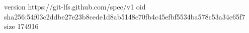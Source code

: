 version https://git-lfs.github.com/spec/v1
oid sha256:54f03c2ddbe27e23b8cede1d8ab5148c70fb4c45efbf5534ba578c53a34c65f7
size 174916
